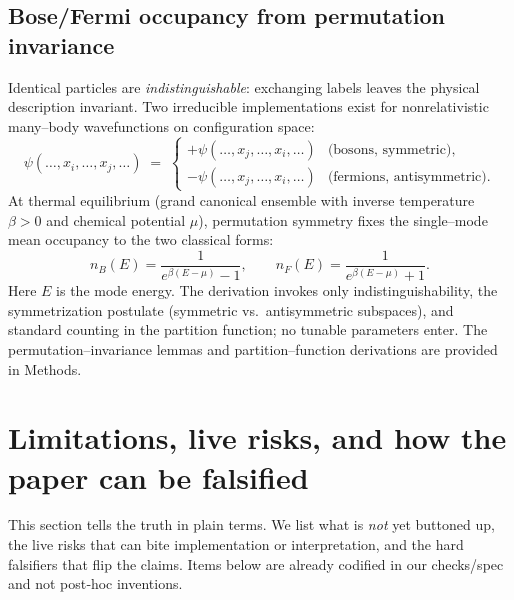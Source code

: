 \documentclass[11pt]{article}
\begin{document}
\subsection{Bose/Fermi occupancy from permutation invariance}
\label{subsec:bose-fermi}

Identical particles are \emph{indistinguishable}: exchanging labels leaves the physical description invariant. Two irreducible implementations exist for nonrelativistic many–body wavefunctions on configuration space:
\[
\psi(\ldots,x_i,\ldots,x_j,\ldots)\;=\;\begin{cases}
+\psi(\ldots,x_j,\ldots,x_i,\ldots) & \text{(bosons, symmetric)},\\[2pt]
-\psi(\ldots,x_j,\ldots,x_i,\ldots) & \text{(fermions, antisymmetric)}.
\end{cases}
\]
At thermal equilibrium (grand canonical ensemble with inverse temperature $\beta>0$ and chemical potential $\mu$), permutation symmetry fixes the single–mode mean occupancy to the two classical forms:
\[
\boxed{n_B(E) = \frac{1}{e^{\beta(E-\mu)}-1}, \qquad
n_F(E) = \frac{1}{e^{\beta(E-\mu)}+1}}.
\]
Here $E$ is the mode energy. The derivation invokes only indistinguishability, the symmetrization postulate (symmetric vs.\ antisymmetric subspaces), and standard counting in the partition function; no tunable parameters enter. The permutation–invariance lemmas and partition–function derivations are provided in Methods.


\section{Limitations, live risks, and how the paper can be falsified}
This section tells the truth in plain terms. We list what is \emph{not} yet buttoned up, the live risks that can bite implementation or interpretation, and the hard falsifiers that flip the claims. Items below are already codified in our checks/spec and not post‑hoc inventions. %
\end{document}
